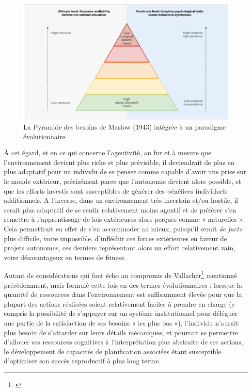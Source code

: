 \begin{figure}[!ht]
    \centering
    \includegraphics[width=17cm]{img/pyramide_besoins.png}
    \caption{La Pyramide des besoins de Maslow (1943) intégrée à un paradigme évolutionnaire}
    \label{pyramide_besoins}
\end{figure}

À cet égard, et en ce qui concerne l'agentivité, au fur et à mesure que l'environnement devient plus riche et plus prévisible, il deviendrait de plus en plus adaptatif pour un individu de se penser comme capable d'avoir une prise sur le monde extérieur, précisément parce que l'autonomie devient alors possible, et que les efforts investis sont susceptibles de générer des bénéfices individuels additionnels. A l'inverse, dans un environnement très incertain et/ou hostile, il serait plus adaptatif de se sentir relativement moins agentif et de préférer s'en remettre à l'apprentissage de lois extérieures alors perçues comme « naturelles ». Cela permettrait en effet de s'en accommoder au mieux, puisqu'il serait \textit{de facto} plus difficile, voire impossible, d’infléchir ces forces extérieures en faveur de projets autonomes, ces derniers représentant alors un effort relativement vain, voire désavantageux en termes de fitness.

Autant de considérations qui font écho au compromis de Vallacher\footnote{\cite{vallacher_levels_1989}} mentionné précédemment, mais formulé cette fois en des termes évolutionnaires : lorsque la quantité de ressources dans l'environnement est suffisamment élevée pour que la plupart des actions réalisées soient relativement faciles à prendre en charge (y compris la possibilité de s'appuyer sur un système institutionnel pour déléguer une partie de la satisfaction de ses besoins « les plus bas »), l'individu n'aurait plus besoin de s'attarder sur leurs détails mécaniques, et pourrait se permettre d'allouer ses ressources cognitives à l’interprétation plus abstraite de ses actions, le développement de capacités de planification associées étant susceptible d'optimiser son succès reproductif à plus long terme. 

